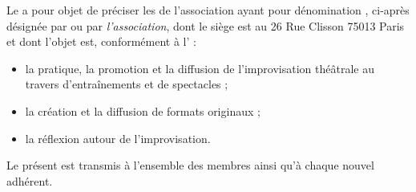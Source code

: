 Le \RI{} a pour objet de préciser les \statuts{} de l'association ayant pour dénomination \textit{\metae{}}, ci-après désignée par \textit{\meta{}} ou par \textit{l'association}, dont le siège est au 26 Rue Clisson 75013 Paris et dont l'objet est, conformément à l' :
\begin{itemize}
\item la pratique, la promotion et la diffusion de l'improvisation théâtrale au travers d'entraînements et de spectacles ;
\item la création et la diffusion de formats originaux ;
\item la réflexion autour de l'improvisation.
\end{itemize}

Le présent \RI{} est transmis à l'ensemble des membres ainsi qu'à chaque nouvel adhérent.
